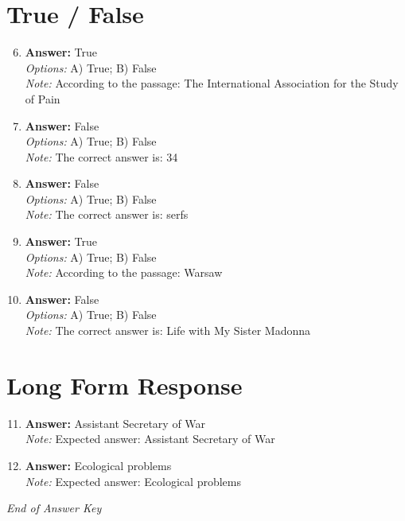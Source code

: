 \documentclass[12pt]{article}
\begin{document}
\section*{True / False}
\begin{enumerate}[label=\arabic*.]
\setcounter{enumi}{5}
\item \textbf{Answer:} True
\\ \textit{Options:} A) True; B) False
\\ \textit{Note:} According to the passage: The International Association for the Study of Pain
\item \textbf{Answer:} False
\\ \textit{Options:} A) True; B) False
\\ \textit{Note:} The correct answer is: 34
\item \textbf{Answer:} False
\\ \textit{Options:} A) True; B) False
\\ \textit{Note:} The correct answer is: serfs
\item \textbf{Answer:} True
\\ \textit{Options:} A) True; B) False
\\ \textit{Note:} According to the passage: Warsaw
\item \textbf{Answer:} False
\\ \textit{Options:} A) True; B) False
\\ \textit{Note:} The correct answer is: Life with My Sister Madonna
\end{enumerate}

\section*{Long Form Response}
\begin{enumerate}[label=\arabic*.]
\setcounter{enumi}{10}
\item \textbf{Answer:} Assistant Secretary of War
\\ \textit{Note:} Expected answer: Assistant Secretary of War
\item \textbf{Answer:} Ecological problems
\\ \textit{Note:} Expected answer: Ecological problems
\end{enumerate}

\vfill
\noindent\textit{End of Answer Key}
\end{document}

